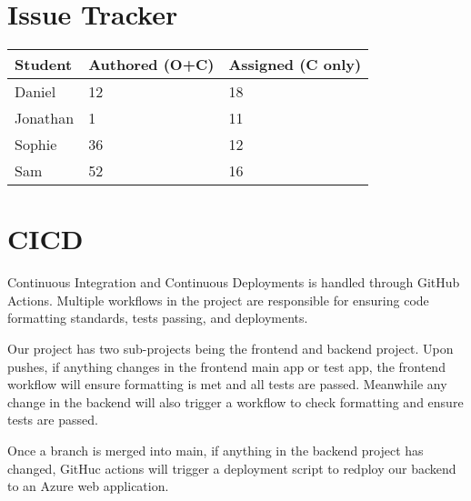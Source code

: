 \documentclass{article}
\begin{document}
\section{Issue Tracker}

\begin{table}[H]
\centering
\begin{tabular}{lll}
\toprule
\textbf{Student} & \textbf{Authored (O+C)} & \textbf{Assigned (C only)}\\
\midrule
Daniel & 12 & 18 \\
Jonathan & 1 & 11 \\
Sophie & 36 & 12 \\
Sam & 52 & 16 \\
\bottomrule
\end{tabular}
\end{table}


\section{CICD}

Continuous Integration and Continuous Deployments is handled through GitHub Actions. Multiple workflows in the project are responsible for ensuring code formatting standards, tests passing, and deployments. 

Our project has two sub-projects being the frontend and backend project. Upon pushes, if anything changes in the frontend main app or test app, the frontend workflow will ensure formatting is met and all tests are passed. Meanwhile any change in the backend will also trigger a workflow to check formatting and ensure tests are passed. 

Once a branch is merged into main, if anything in the backend project has changed, GitHuc actions will trigger a deployment script to redploy our backend to an Azure web application.
\end{document}
